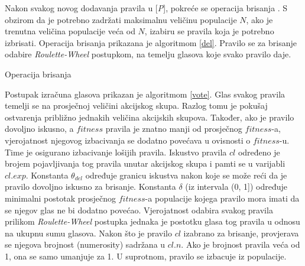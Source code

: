 \documentclass[times, utf8, zavrsni]{fer}
\begin{document}
Nakon svakog novog dodavanja pravila u [\emph{P}], pokreće se operacija brisanja \citep{1}.
S obzirom da je potrebno zadržati maksimalnu veličinu populacije $N$, ako je trenutna veličina populacije veća od $N$, izabiru se pravila koja je potrebno izbrisati.
Operacija brisanja prikazana je algoritmom \ref{del}.
Pravilo se za brisanje odabire \emph{Roulette-Wheel} postupkom, na temelju glasova koje svako pravilo daje.
\begin{algorithm}
\caption{Operacija brisanja}
\label{del}
\begin{algorithmic}
\RETURN
\ENDIF
{}
\ENDFOR
\STATE{$r$ := proizvoljan decimalni broj iz intervala [0, 1)}
\ELSE
{}
\ENDIF
\RETURN
\ENDIF
\ENDFOR
\end{algorithmic}
\end{algorithm}
Postupak izračuna glasova prikazan je algoritmom \ref{vote}.
Glas svakog pravila temelji se na prosječnoj veličini akcijskog skupa.
Razlog tomu je pokušaj ostvarenja približno jednakih veličina akcijskih skupova.
Također, ako je pravilo dovoljno iskusno, a $fitness$ pravila je znatno manji od prosječnog $fitness$-a, vjerojatnost njegovog izbacivanja se dodatno povećava u ovisnosti o $fitness$-u.
Time je osigurano izbacivanje lošijih pravila.
Iskustvo pravila $cl$ određeno je brojem pojavljivanja tog pravila unutar akcijskog skupa i pamti se u varijabli $cl.exp$.
Konstanta $\theta_{del}$ određuje granicu iskustva nakon koje se može reći da je pravilo dovoljno iskusno za brisanje.
Konstanta $\delta$ (iz intervala (0, 1]) određuje minimalni postotak prosječnog $fitness$-a populacije kojega pravilo mora imati da se njegov glas ne bi dodatno povećao.
Vjerojatnost odabira svakog pravila prilikom \emph{Roulette-Wheel} postupka jednaka je postotku glasa tog pravila u odnosu na ukupnu sumu glasova.
Nakon što je pravilo $cl$ izabrano za brisanje, provjerava se njegova brojnost \engl(numerosity) sadržana u $cl.n$.
Ako je brojnost pravila veća od 1, ona se samo umanjuje za 1.
U suprotnom, pravilo se izbacuje iz populacije.
\end{document}
